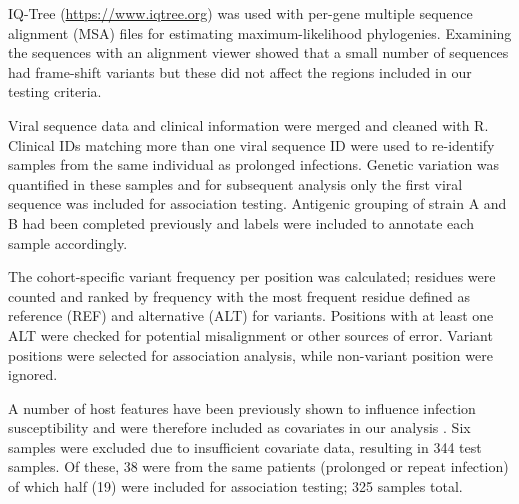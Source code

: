 \documentclass{article} %
\begin{document}
IQ-Tree 
(\url{https://www.iqtree.org})
\citep{nguyen2015iq}
was used with per-gene multiple sequence alignment (MSA) files for estimating maximum-likelihood phylogenies.
Examining the sequences with an alignment viewer showed that a small number of sequences had frame-shift variants but these did not affect the regions included in our testing criteria.

Viral sequence data and clinical information were merged and cleaned with R.
Clinical IDs matching more than one viral sequence ID were used to re-identify samples from the same individual as prolonged infections. 
Genetic variation was quantified in these samples and for subsequent analysis only the first viral sequence was included for association testing. 
Antigenic grouping of strain A and B had been completed previously and labels were included to annotate each sample accordingly.

The cohort-specific variant frequency per position was calculated;
residues were counted and ranked by frequency
with the most frequent residue defined as reference (REF) and alternative (ALT) for variants.
Positions with at least one ALT were checked for potential misalignment or other sources of error. 
Variant positions were selected for association analysis, while non-variant position were ignored.

A number of host features have been previously shown to influence infection susceptibility and were therefore included as covariates in our analysis 
\citep{rosas2022upper}.
Six samples were excluded due to insufficient covariate data, resulting in 344 test samples. 
Of these, 38 were from the same patients (prolonged or repeat infection) of which half (19) were included for association testing; 325 samples total.
\end{document}
